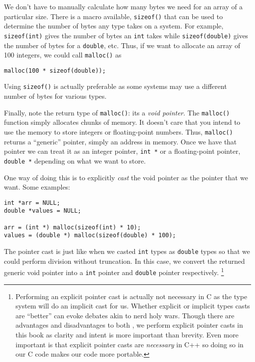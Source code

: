 We don't have to manually calculate how many bytes we need
for an array of a particular size.  There is a macro available, 
\texttt{sizeof()} that can be used to determine the number
of bytes any type takes on a system.  For example, 
\texttt{sizeof(int)} gives the number of bytes an \texttt{int}
takes while \texttt{sizeof(double)} gives the number of
bytes for a \texttt{double}, etc.  Thus, if we want to
allocate an array of 100 integers, we could call \texttt{malloc()}
as 

\texttt{malloc(100 * sizeof(double));}

Using \texttt{sizeof()} is actually preferable as some systems
may use a different number of bytes for various types.

Finally, note the return type of \texttt{malloc()}: its a 
\emph{void pointer}.  The \texttt{malloc()} function 
simply allocates chunks of memory.  It doesn't care that you
intend to use the memory to store integers or floating-point
numbers.  Thus, \texttt{malloc()} returns a ``generic''
pointer, simply an address in memory.  Once we have that
pointer we can treat it as an integer pointer, \texttt{int *}
or a floating-point pointer, \texttt{double *} depending
on what we want to store.  

One way of doing this is to explicitly \emph{cast} the void
pointer as the pointer that we want.  Some examples:

\begin{verbatim}
int *arr = NULL;
double *values = NULL;

arr = (int *) malloc(sizeof(int) * 10);
values = (double *) malloc(sizeof(double) * 100);
\end{verbatim}

The pointer cast is just like when we casted \texttt{int}
types as \texttt{double} types so that we could perform
division without truncation.  In this case, we convert the
returned generic void pointer into a \texttt{int} pointer
and \texttt{double} pointer respectively.  \footnote{Performing
an explicit pointer cast is actually not necessary in C as
the type system will do an implicit cast for us.  Whether
explicit or implicit types casts are ``better'' can evoke
debates akin to nerd holy wars.  Though there are advantages
and disadvantages to both \cite{stackOverflowCasts}, we perform explicit 
pointer casts in this book as clarity and intent is
more important than brevity.  Even more important is
that explicit pointer casts are \emph{necessary} in 
C++ so doing so in our C code makes our code
more portable.}

